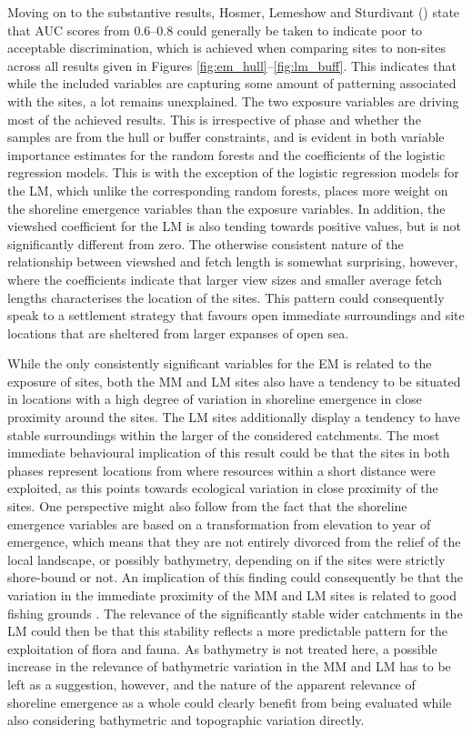 \documentclass[12pt, a4paper]{article}
\begin{document}
Moving on to the substantive results, Hosmer, Lemeshow and Sturdivant (\citeyear[][177]{hosmer2013}) state that AUC scores from 0.6--0.8 could generally be taken to indicate poor to acceptable discrimination, which is achieved when comparing sites to non-sites across all results given in Figures \ref{fig:em_hull}--\ref{fig:lm_buff}. This indicates that while the included variables are capturing some amount of patterning associated with the sites, a lot remains unexplained. The two exposure variables are driving most of the achieved results. This is irrespective of phase and whether the samples are from the hull or buffer constraints, and is evident in both variable importance estimates for the random forests and the coefficients of the logistic regression models. This is with the exception of the logistic regression models for the LM, which unlike the corresponding random forests, places more weight on the shoreline emergence variables than the exposure variables. In addition, the viewshed coefficient for the LM is also tending towards positive values, but is not significantly different from zero. The otherwise consistent nature of the relationship between viewshed and fetch length is somewhat surprising, however, where the coefficients indicate that larger view sizes and smaller average fetch lengths characterises the location of the sites. This pattern could consequently speak to a settlement strategy that favours open immediate surroundings and site locations that are sheltered from larger expanses of open sea. \par
While the only consistently significant variables for the EM is related to the exposure of sites, both the MM and LM sites also have a tendency to be situated in locations with a high degree of variation in shoreline emergence in close proximity around the sites. The LM sites additionally display a tendency to have stable surroundings within the larger of the considered catchments. The most immediate behavioural implication of this result could be that the sites in both phases represent locations from where resources within a short distance were exploited, as this points towards ecological variation in close proximity of the sites. One perspective might also follow from the fact that the shoreline emergence variables are based on a transformation from elevation to year of emergence, which means that they are not entirely divorced from the relief of the local landscape, or possibly bathymetry, depending on if the sites were strictly shore-bound or not. An implication of this finding could consequently be that the variation in the immediate proximity of the MM and LM sites is related to good fishing grounds \citep[cf.][]{darmark2018}. The relevance of the significantly stable wider catchments in the LM could then be that this stability reflects a more predictable pattern for the exploitation of ﬂora and fauna. As bathymetry is not treated here, a possible increase in the relevance of bathymetric variation in the MM and LM has to be left as a suggestion, however, and the nature of the apparent relevance of shoreline emergence as a whole could clearly benefit from being evaluated while also considering bathymetric and topographic variation directly. \par
\end{document}
